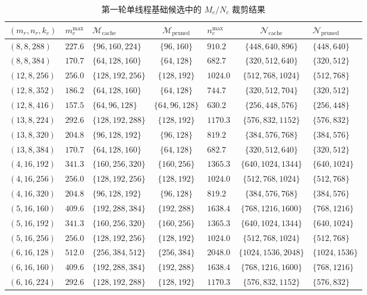 \documentclass[a4paper,11pt,oneside]{article}
\begin{document}
\begin{table}[H]
\centering
\begin{tabular}{lclclcl}
\toprule
\textbf{$(m_r,n_r,k_c)$} & $m_c^{\max}$ & \textbf{$\mathcal{M}_{\text{cache}}$} & \textbf{$\mathcal{M}_{\text{pruned}}$} & $n_c^{\max}$ & \textbf{$\mathcal{N}_{\text{cache}}$} & \textbf{$\mathcal{N}_{\text{pruned}}$} \\
\midrule
$(8,8,288)$   & $227.6$ & $\{96,160,224\}$   & $\{96,160\}$   & $910.2$  & $\{448,640,896\}$     & $\{448,640\}$ \\
$(8,8,384)$   & $170.7$ & $\{64,128,160\}$   & $\{64,128\}$   & $682.7$  & $\{320,512,640\}$     & $\{320,512\}$ \\
$(12,8,256)$  & $256.0$ & $\{128,192,256\}$  & $\{128,192\}$  & $1024.0$ & $\{512,768,1024\}$    & $\{512,768\}$ \\
$(12,8,352)$  & $186.2$ & $\{64,128,160\}$   & $\{64,128\}$   & $744.7$  & $\{320,512,704\}$     & $\{320,512\}$ \\
$(12,8,416)$  & $157.5$ & $\{64,96,128\}$    & $\{64,96,128\}$ & $630.2$ & $\{256,448,576\}$     & $\{256,448\}$ \\
$(13,8,224)$  & $292.6$ & $\{128,192,288\}$  & $\{128,192\}$  & $1170.3$ & $\{576,832,1152\}$    & $\{576,832\}$ \\
$(13,8,320)$  & $204.8$ & $\{96,128,192\}$   & $\{96,128\}$   & $819.2$  & $\{384,576,768\}$     & $\{384,576\}$ \\
$(13,8,384)$  & $170.7$ & $\{64,128,160\}$   & $\{64,128\}$   & $682.7$  & $\{320,512,640\}$     & $\{320,512\}$ \\
$(4,16,192)$  & $341.3$ & $\{160,256,320\}$  & $\{160,256\}$  & $1365.3$ & $\{640,1024,1344\}$   & $\{640,1024\}$ \\
$(4,16,256)$  & $256.0$ & $\{128,192,256\}$  & $\{128,192\}$  & $1024.0$ & $\{512,768,1024\}$    & $\{512,768\}$ \\
$(4,16,320)$  & $204.8$ & $\{96,128,192\}$   & $\{96,128\}$   & $819.2$  & $\{384,576,768\}$     & $\{384,576\}$ \\
$(5,16,160)$  & $409.6$ & $\{192,288,384\}$  & $\{192,288\}$  & $1638.4$ & $\{768,1216,1600\}$   & $\{768,1216\}$ \\
$(5,16,192)$  & $341.3$ & $\{160,256,320\}$  & $\{160,256\}$  & $1365.3$ & $\{640,1024,1344\}$   & $\{640,1024\}$ \\
$(5,16,256)$  & $256.0$ & $\{128,192,256\}$  & $\{128,192\}$  & $1024.0$ & $\{512,768,1024\}$    & $\{512,768\}$ \\
$(6,16,128)$  & $512.0$ & $\{256,384,512\}$  & $\{256,384\}$  & $2048.0$ & $\{1024,1536,2048\}$  & $\{1024,1536\}$ \\
$(6,16,160)$  & $409.6$ & $\{192,288,384\}$  & $\{192,288\}$  & $1638.4$ & $\{768,1216,1600\}$   & $\{768,1216\}$ \\
$(6,16,224)$  & $292.6$ & $\{128,192,288\}$  & $\{128,192\}$  & $1170.3$ & $\{576,832,1152\}$    & $\{576,832\}$ \\
\bottomrule
\end{tabular}
\caption{第一轮单线程基础候选中的 $M_c/N_c$ 裁剪结果}
\label{tab:appendix_round1_pruned}
\end{table}
\end{document}

